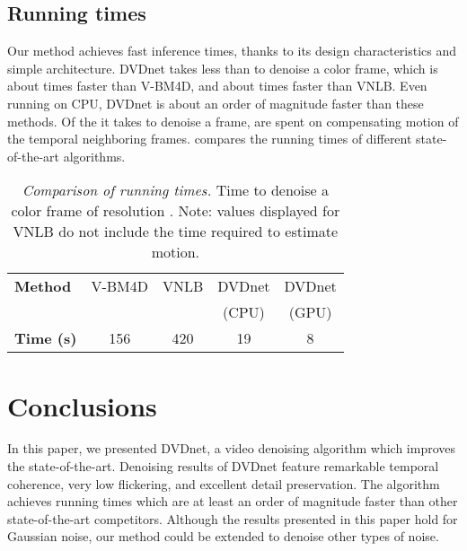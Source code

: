 \documentclass{article}
\begin{document}
\subsection{Running times}
	\label{ssec:running-times}
	
	Our method achieves fast inference times, thanks to its design characteristics and simple architecture. DVDnet takes less than  to denoise a  color frame, which is about  times faster than V-BM4D, and about  times faster than VNLB. Even running on CPU, DVDnet is about an order of magnitude faster than these methods. Of the  it takes to denoise a frame,  are spent on compensating motion of the temporal neighboring frames.  compares the running times of different state-of-the-art algorithms.
\begin{table}[!htbp]
		\centering
		\caption{\textit{Comparison of running times.} Time to denoise a color frame of resolution . Note: values displayed for VNLB do not include the time required to estimate motion.}
		\begin{minipage}[b]{0.8\linewidth}
			\centering
			\begin{tabular}{@{}l c c c c@{}}
				\toprule[1pt]
				\textbf{Method} & V-BM4D & VNLB & DVDnet & DVDnet \\
				&  &  & (CPU) & (GPU)\\
				\midrule[0.8pt]
				\textbf{Time (s)} & 156 & 420 & 19 & 8 \\
				\bottomrule[0.5pt]
			\end{tabular}
			
		\end{minipage}
		\label{tbl:running-times}
	\end{table}


	\section{Conclusions}
	\label{sec:conclusions}
	
	In this paper, we presented DVDnet, a video denoising algorithm which improves the state-of-the-art. Denoising results of DVDnet feature remarkable temporal coherence, very low flickering, and excellent detail preservation. The algorithm achieves running times which are at least an order of magnitude faster than other state-of-the-art competitors. Although the results presented in this paper hold for Gaussian noise, our method could be extended to denoise other types of noise.
		
	\vfill\pagebreak
	
	
	
\end{document}
